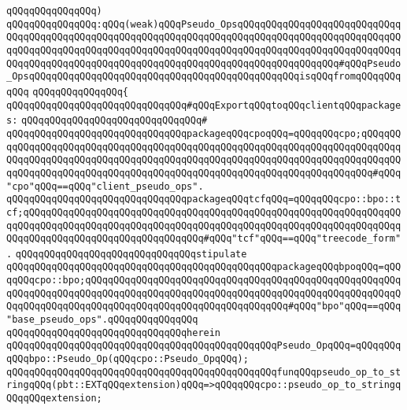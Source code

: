 \verb|qQQqqQQqqQQqqQQq)|\newline
\verb|qQQqqQQqqQQqqQQq:qQQq(weak)qQQqPseudo_OpsqQQqqQQqqQQqqQQqqQQqqQQqqQQqqQQqqQQqqQQqqQQqqQQqqQQqqQQqqQQqqQQqqQQqqQQqqQQqqQQqqQQqqQQqqQQqqQQqqQQqqQQqqQQqqQQqqQQqqQQqqQQqqQQqqQQqqQQqqQQqqQQqqQQqqQQqqQQqqQQqqQQqqQQqqQQqqQQqqQQqqQQqqQQqqQQqqQQqqQQqqQQqqQQqqQQqqQQqqQQqqQQqqQQq#qQQqPseudo_OpsqQQqqQQqqQQqqQQqqQQqqQQqqQQqqQQqqQQqqQQqqQQqqQQqisqQQqfromqQQqqQQqqQQq|\newline
\verb|qQQqqQQqqQQqqQQq{|\newline
\verb|qQQqqQQqqQQqqQQqqQQqqQQqqQQqqQQq#qQQqExportqQQqtoqQQqclientqQQqpackages:|\newline
\verb|qQQqqQQqqQQqqQQqqQQqqQQqqQQqqQQq#|\newline
\verb|qQQqqQQqqQQqqQQqqQQqqQQqqQQqqQQqpackageqQQqcpoqQQq=qQQqqQQqcpo;qQQqqQQqqQQqqQQqqQQqqQQqqQQqqQQqqQQqqQQqqQQqqQQqqQQqqQQqqQQqqQQqqQQqqQQqqQQqqQQqqQQqqQQqqQQqqQQqqQQqqQQqqQQqqQQqqQQqqQQqqQQqqQQqqQQqqQQqqQQqqQQqqQQqqQQqqQQqqQQqqQQqqQQqqQQqqQQqqQQqqQQqqQQqqQQqqQQqqQQqqQQqqQQqqQQq#qQQq"cpo"qQQq==qQQq"client_pseudo_ops".|\newline
\verb|qQQqqQQqqQQqqQQqqQQqqQQqqQQqqQQqpackageqQQqtcfqQQq=qQQqqQQqcpo::bpo::tcf;qQQqqQQqqQQqqQQqqQQqqQQqqQQqqQQqqQQqqQQqqQQqqQQqqQQqqQQqqQQqqQQqqQQqqQQqqQQqqQQqqQQqqQQqqQQqqQQqqQQqqQQqqQQqqQQqqQQqqQQqqQQqqQQqqQQqqQQqqQQqqQQqqQQqqQQqqQQqqQQqqQQqqQQqqQQq#qQQq"tcf"qQQq==qQQq"treecode_form".|\newline
\newline
\verb|qQQqqQQqqQQqqQQqqQQqqQQqqQQqqQQqstipulate|\newline
\verb|qQQqqQQqqQQqqQQqqQQqqQQqqQQqqQQqqQQqqQQqqQQqqQQqpackageqQQqbpoqQQq=qQQqqQQqcpo::bpo;qQQqqQQqqQQqqQQqqQQqqQQqqQQqqQQqqQQqqQQqqQQqqQQqqQQqqQQqqQQqqQQqqQQqqQQqqQQqqQQqqQQqqQQqqQQqqQQqqQQqqQQqqQQqqQQqqQQqqQQqqQQqqQQqqQQqqQQqqQQqqQQqqQQqqQQqqQQqqQQqqQQqqQQqqQQqqQQq#qQQq"bpo"qQQq==qQQq"base_pseudo_ops".qQQqqQQqqQQqqQQq|\newline
\verb|qQQqqQQqqQQqqQQqqQQqqQQqqQQqqQQqherein|\newline
\newline
\verb|qQQqqQQqqQQqqQQqqQQqqQQqqQQqqQQqqQQqqQQqqQQqqQQqPseudo_OpqQQq=qQQqqQQqqQQqbpo::Pseudo_Op(qQQqcpo::Pseudo_OpqQQq);|\newline
\newline
\verb|qQQqqQQqqQQqqQQqqQQqqQQqqQQqqQQqqQQqqQQqqQQqqQQqfunqQQqpseudo_op_to_stringqQQq(pbt::EXTqQQqextension)qQQq=>qQQqqQQqcpo::pseudo_op_to_stringqQQqqQQqextension;|\newline
